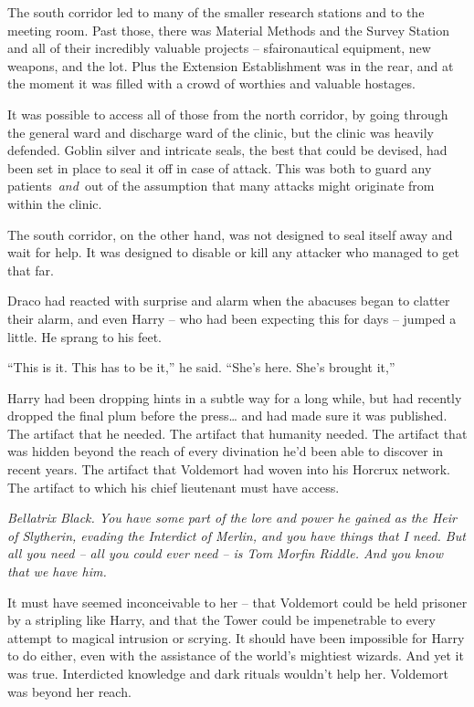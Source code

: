 The south corridor led to many of the smaller research stations and to
the meeting room. Past those, there was Material Methods and the Survey
Station and all of their incredibly valuable projects -- sfaironautical
equipment, new weapons, and the lot. Plus the Extension Establishment
was in the rear, and at the moment it was filled with a crowd of
worthies and valuable hostages.

It was possible to access all of those from the north corridor, by going
through the general ward and discharge ward of the clinic, but the
clinic was heavily defended. Goblin silver and intricate seals, the best
that could be devised, had been set in place to seal it off in case of
attack. This was both to guard any patients~\emph{and}~out of the
assumption that many attacks might originate from within the clinic.

The south corridor, on the other hand, was not designed to seal itself
away and wait for help. It was designed to disable or kill any attacker
who managed to get that far.

Draco had reacted with surprise and alarm when the abacuses began to
clatter their alarm, and even Harry -- who had been expecting this for
days -- jumped a little. He sprang to his feet.

``This is it. This has to be it,'' he said. ``She's here. She's brought
it,''

Harry had been dropping hints in a subtle way for a long while, but had
recently dropped the final plum before the press\ldots{} and had made
sure it was published. The artifact that he needed. The artifact that
humanity needed. The artifact that was hidden beyond the reach of every
divination he'd been able to discover in recent years. The artifact that
Voldemort had woven into his Horcrux network. The artifact to which his
chief lieutenant must have access.

\emph{Bellatrix Black. You have some part of the lore and power he
gained as the Heir of Slytherin, evading the Interdict of Merlin, and
you have things that I need. But all you need -- all you could ever need
-- is Tom Morfin Riddle. And you know that we have him.}

It must have seemed inconceivable to her -- that Voldemort could be held
prisoner by a stripling like Harry, and that the Tower could be
impenetrable to every attempt to magical intrusion or scrying. It should
have been impossible for Harry to do either, even with the assistance of
the world's mightiest wizards. And yet it was true. Interdicted
knowledge and dark rituals wouldn't help her. Voldemort was beyond her
reach.

